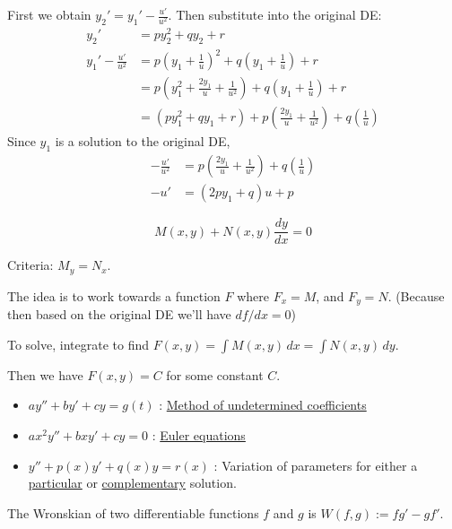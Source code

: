 \begin{compute}
  First we obtain $\displaystyle y_2'=y_1'-\frac{u'}{u^2}$. Then substitute into the original DE:
  \begin{align*}
    y_2' &= py_2^2+qy_2+r                                                                  \\
    y_1'-\frac{u'}{u^2}
         &= p\left(y_1+\frac1u\right)^2+q\left(y_1+\frac1u\right)+r                        \\
         &= p\left(y_1^2+\frac{2y_1}{u}+\frac1{u^2}\right)+q\left(y_1+\frac1u\right)+r     \\
         &= (py_1^2+qy_1+r)+p\left(\frac{2y_1}{u}+\frac1{u^2}\right)+q\left(\frac1u\right)
  \end{align*}
  Since $y_1$ is a solution to the original DE,
  \begin{align*}
    -\frac{u'}{u^2} &= p\left(\frac{2y_1}{u}+\frac1{u^2}\right)+q\left(\frac1u\right) \\
    -u'             &=(2py_1+q)u+p
  \end{align*}
\end{compute}

\label{db2397c}

$$M(x,y)+N(x,y)\frac{dy}{dx}=0$$

Criteria: $M_y=N_x$.

The idea is to work towards a function $F$ where $F_x=M$, and $F_y=N$. (Because
then based on the original DE we'll have $df/dx=0$)

To solve, integrate to find $F(x,y)=\int M(x,y)\,dx=\int N(x,y)\,dy$.

Then we have $F(x,y)=C$ for some constant $C$.


\begin{itemize}
  \item $ay''+by'+cy=g(t)$ : \href{af8932c}{Method of undetermined
        coefficients}
  \item $ax^2y''+bxy'+cy=0$ : \href{c15a777}{Euler equations}
  \item $y''+p(x)y'+q(x)y=r(x)$ : Variation of parameters for either a
        \href{cc51fcb}{particular} or
        \href{d359b97}{complementary} solution.
\end{itemize}

\label{b70073b}

The Wronskian of two differentiable functions $f$ and $g$ is $W(f,g):=fg'-gf'$.

